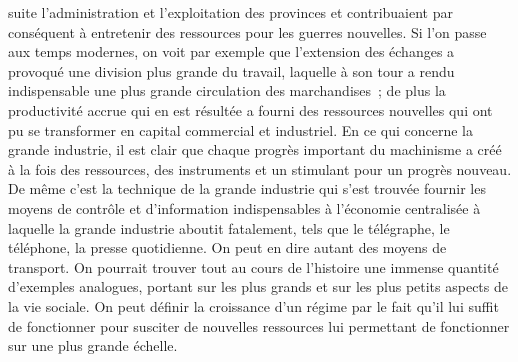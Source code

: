 \documentclass[french,twoside]{book} %
\begin{document}
suite l'administration et l'exploitation des provinces et contribuaient par conséquent à entretenir des ressources pour les guerres nouvelles. Si l'on passe aux temps modernes, on voit par exemple que l'extension des échanges a provoqué une division plus grande du travail, laquelle à son tour a rendu indispensable une plus grande circulation des marchandises ; de plus la productivité accrue qui en est résultée a fourni des ressources nouvelles qui ont pu se transformer en capital commercial et industriel. En ce qui concerne la grande industrie, il est clair que chaque progrès important du machinisme a créé à la fois des ressources, des instruments et un stimulant pour un progrès nouveau. De même c'est la technique de la grande industrie qui s'est trouvée fournir les moyens de contrôle et d'information indispensables à l'économie centralisée à laquelle la grande industrie aboutit fatalement, tels que le télégraphe, le téléphone, la presse quotidienne. On peut en dire autant des moyens de transport. On pourrait trouver tout au cours de l'histoire une immense quantité d'exemples analogues, portant sur les plus grands et sur les plus petits aspects de la vie sociale. On peut définir la croissance d'un régime par le fait qu'il lui suffit de fonctionner pour susciter de nouvelles ressources lui permettant de fonctionner sur une plus grande échelle.\par
\end{document}
